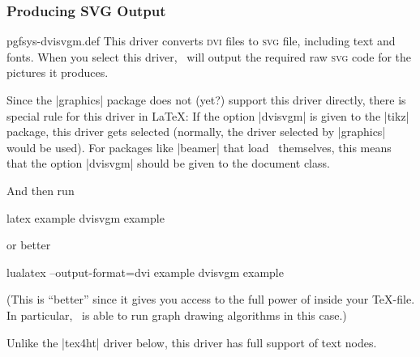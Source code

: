 \subsubsection{Producing SVG Output}

\begin{filedescription}{pgfsys-dvisvgm.def}
    This driver converts \textsc{dvi} files to \textsc{svg} file, including
    text and fonts. When you select this driver, \pgfname\ will output the
    required raw \textsc{svg} code for the pictures it produces.

    Since the |graphics| package does not (yet?) support this driver directly,
    there is special rule for this driver in \LaTeX: If the option |dvisvgm| is
    given to the |tikz| package, this driver gets selected (normally, the
    driver selected by |graphics| would be used). For packages like |beamer|
    that load \pgfname\ themselves, this means that the option |dvisvgm| should
    be given to the document class.

    And then run
\begin{codeexample}
latex example
dvisvgm example
\end{codeexample}
    or better
\begin{codeexample}
lualatex --output-format=dvi example
dvisvgm example
\end{codeexample}
    (This is ``better'' since it gives you access to the full power of 
    inside your \TeX-file. In particular, \tikzname\ is able to run graph
    drawing algorithms in this case.)

    Unlike the |tex4ht| driver below, this driver has full support of text
    nodes.
\end{filedescription}


